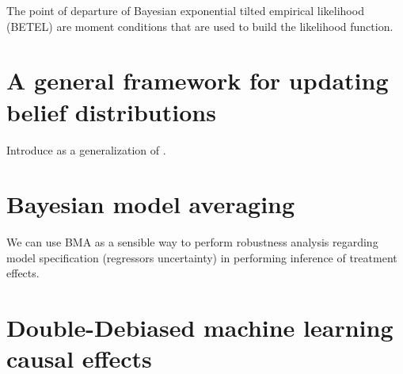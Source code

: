 The point of departure of Bayesian exponential tilted empirical likelihood (BETEL) are moment conditions that are used to build the likelihood function.

\section{A general framework for updating belief distributions}\label{sec12_8}
Introduce \cite{bissiri2016general} as a generalization of \cite{chernozhukov2003mcmc}.

\section{Bayesian model averaging}\label{sec12_9}
We can use BMA as a sensible way to perform robustness analysis regarding model specification (regressors uncertainty) in performing inference of treatment effects.

\section{Double-Debiased machine learning causal effects}\label{sec12_10}

